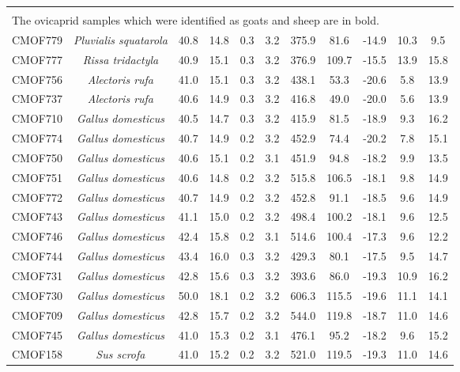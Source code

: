 \documentclass[review]{elsarticle} %
\begin{document}
\begin{longtable}[t]{c>{}cccccccccc}
\endfoot
\bottomrule
\multicolumn{11}{l}{\rule{0pt}{1em}\textit{Note: }}\\
\multicolumn{11}{l}{\rule{0pt}{1em}The ovicaprid samples which were identified as goats and sheep are in bold.}\\
\endlastfoot
CMOF779 & \em{Pluvialis squatarola} & 40.8 & 14.8 & 0.3 & 3.2 & 375.9 & 81.6 & -14.9 & 10.3 & 9.5\\
CMOF777 & \em{Rissa tridactyla} & 40.9 & 15.1 & 0.3 & 3.2 & 376.9 & 109.7 & -15.5 & 13.9 & 15.8\\
CMOF756 & \em{Alectoris rufa} & 41.0 & 15.1 & 0.3 & 3.2 & 438.1 & 53.3 & -20.6 & 5.8 & 13.9\\
CMOF737 & \em{Alectoris rufa} & 40.6 & 14.9 & 0.3 & 3.2 & 416.8 & 49.0 & -20.0 & 5.6 & 13.9\\
CMOF710 & \em{Gallus domesticus} & 40.5 & 14.7 & 0.3 & 3.2 & 415.9 & 81.5 & -18.9 & 9.3 & 16.2\\
CMOF774 & \em{Gallus domesticus} & 40.7 & 14.9 & 0.2 & 3.2 & 452.9 & 74.4 & -20.2 & 7.8 & 15.1\\
CMOF750 & \em{Gallus domesticus} & 40.6 & 15.1 & 0.2 & 3.1 & 451.9 & 94.8 & -18.2 & 9.9 & 13.5\\
CMOF751 & \em{Gallus domesticus} & 40.6 & 14.8 & 0.2 & 3.2 & 515.8 & 106.5 & -18.1 & 9.8 & 14.9\\
CMOF772 & \em{Gallus domesticus} & 40.7 & 14.9 & 0.2 & 3.2 & 452.8 & 91.1 & -18.5 & 9.6 & 14.9\\
CMOF743 & \em{Gallus domesticus} & 41.1 & 15.0 & 0.2 & 3.2 & 498.4 & 100.2 & -18.1 & 9.6 & 12.5\\
CMOF746 & \em{Gallus domesticus} & 42.4 & 15.8 & 0.2 & 3.1 & 514.6 & 100.4 & -17.3 & 9.6 & 12.2\\
CMOF744 & \em{Gallus domesticus} & 43.4 & 16.0 & 0.3 & 3.2 & 429.3 & 80.1 & -17.5 & 9.5 & 14.7\\
CMOF731 & \em{Gallus domesticus} & 42.8 & 15.6 & 0.3 & 3.2 & 393.6 & 86.0 & -19.3 & 10.9 & 16.2\\
CMOF730 & \em{Gallus domesticus} & 50.0 & 18.1 & 0.2 & 3.2 & 606.3 & 115.5 & -19.6 & 11.1 & 14.1\\
CMOF709 & \em{Gallus domesticus} & 42.8 & 15.7 & 0.2 & 3.2 & 544.0 & 119.8 & -18.7 & 11.0 & 14.6\\
CMOF745 & \em{Gallus domesticus} & 41.0 & 15.3 & 0.2 & 3.1 & 476.1 & 95.2 & -18.2 & 9.6 & 15.2\\
CMOF158 & \em{Sus scrofa} & 41.0 & 15.2 & 0.2 & 3.2 & 521.0 & 119.5 & -19.3 & 11.0 & 14.6\\

\end{longtable}
\end{document}
